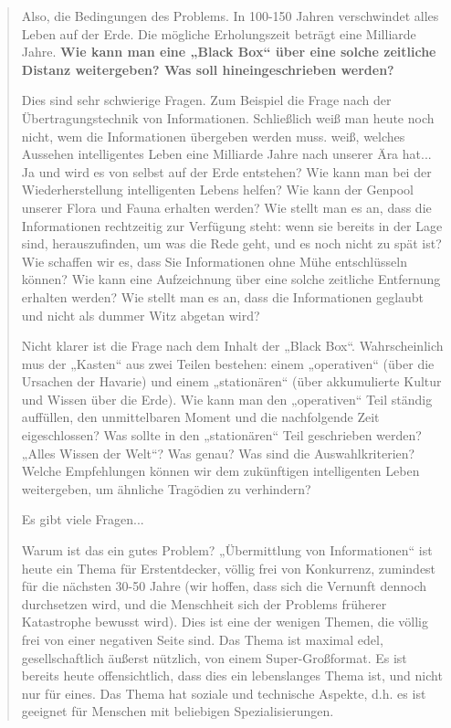 \documentclass[11pt,a4paper]{article}
\begin{document}
{\begin{quote}
Also, die Bedingungen des Problems. In 100-150 Jahren verschwindet alles Leben
auf der Erde. Die mögliche Erholungszeit beträgt eine Milliarde Jahre.
\textbf{Wie kann man eine „Black Box“ über eine solche zeitliche Distanz
  weitergeben? Was soll hineingeschrieben werden?}

Dies sind sehr schwierige Fragen. Zum Beispiel die Frage nach der
Übertragungs\-technik von Informationen. Schließlich weiß man heute noch
nicht, wem die Informationen übergeben werden muss.  weiß, welches Aussehen
intelligentes Leben eine Milliarde Jahre nach unserer Ära hat... Ja und wird
es von selbst auf der Erde entstehen? Wie kann man bei der Wiederherstellung
intelligenten Lebens helfen? Wie kann der Genpool unserer Flora und Fauna
erhalten werden? Wie stellt man es an, dass die Informationen rechtzeitig zur
Verfügung steht: wenn sie bereits in der Lage sind, herauszufinden, um was die
Rede geht, und es noch nicht zu spät ist? Wie schaffen wir es, dass Sie
Informationen ohne Mühe entschlüsseln können? Wie kann eine Aufzeichnung über
eine solche zeitliche Entfernung erhalten werden?  Wie stellt man es an, dass
die Informationen geglaubt und nicht als dummer Witz abgetan wird?

Nicht klarer ist die Frage nach dem Inhalt der „Black Box“. Wahrscheinlich mus
der „Kasten“ aus zwei Teilen bestehen: einem „operativen“ (über die Ursachen
der Havarie) und einem „stationären“ (über akkumulierte Kultur und Wissen über
die Erde). Wie kann man den „operativen“ Teil ständig auffüllen, den
unmittelbaren Moment und die nachfolgende Zeit eigeschlossen? Was sollte in
den „stationären“ Teil geschrieben werden? „Alles Wissen der Welt“? Was genau?
Was sind die Auswahlkriterien?  Welche Empfehlungen können wir dem zukünftigen
intelligenten Leben weitergeben, um ähnliche Tragödien zu verhindern?

Es gibt viele Fragen...

Warum ist das ein gutes Problem? „Übermittlung von Informationen“ ist heute
ein Thema für Erstentdecker, völlig frei von Konkurrenz, zumindest für die
nächsten 30-50 Jahre (wir hoffen, dass sich die Vernunft dennoch durchsetzen
wird, und die Menschheit sich der Problems früherer Katastrophe bewusst wird).
Dies ist eine der wenigen Themen, die völlig frei von einer negativen Seite
sind.  Das Thema ist maximal edel, gesellschaftlich äußerst nützlich, von
einem Super-Großformat.  Es ist bereits heute offensichtlich, dass dies ein
lebenslanges Thema ist, und nicht nur für eines. Das Thema hat soziale und
technische Aspekte, d.h. es ist geeignet für Menschen mit beliebigen
Spezialisierungen.


\end{quote}}
\end{document}
